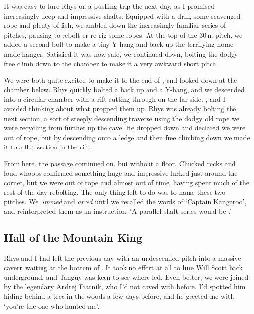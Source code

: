 It was easy to lure Rhys on a pushing trip the next day, as I promised increasingly deep and impressive shafts. Equipped with a drill, some scavenged rope and plenty of fish, we ambled down the increasingly familiar series of pitches, pausing to rebolt or re-rig some ropes. At the top of the 30\,m  pitch, we added a second bolt to make a tiny Y-hang and back up the terrifying home-made hanger. Satisfied it was now safe, we continued down, bolting the dodgy free climb down to the  chamber to make it a very awkward short pitch.
 
We were both quite excited to make it to the end of , and looked down at the chamber below. Rhys quickly bolted a back up and a Y-hang, and we descended into a circular chamber with a rift cutting through on the far side. , and I avoided thinking about what propped them up. Rhys was already bolting the next section, a sort of steeply descending traverse using the dodgy old rope we were recycling from further up the cave. He dropped down and declared we were out of rope, but by descending onto a ledge and then free climbing down we made it to a flat section in the rift.
 
From here, the passage continued on, but without a floor. Chucked rocks and loud whoops confirmed something huge and impressive lurked just around the corner, but we were out of rope and almost out of time, having spent much of the rest of the day rebolting. The only thing left to do was to name these two pitches. We \emph{ummed} and \emph{arred} until we recalled the words of `Captain Kangaroo', and reinterpreted them as an instruction: `A parallel shaft series would be .'

\subsection{Hall of the Mountain King}
    
Rhys and I had left the previous day with an undescended pitch into a massive cavern waiting at the bottom of . It took no effort at all to lure Will Scott back underground, and Tanguy was keen to see where  led. Even better, we were joined by the legendary Andrej Fratnik, who I'd not caved with before. I'd spotted him hiding behind a tree in the woods a few days before, and he greeted me with `you're the one who hunted me'.
 
